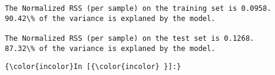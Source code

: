 \documentclass[11pt]{article}
\begin{document}
    \begin{Verbatim}[commandchars=\\\{\}]
The Normalized RSS (per sample) on the training set is 0.0958.
90.42\% of the variance is explaned by the model.

The Normalized RSS (per sample) on the test set is 0.1268.
87.32\% of the variance is explaned by the model.

    \end{Verbatim}

    \begin{Verbatim}[commandchars=\\\{\}]
{\color{incolor}In [{\color{incolor} }]:} 
\end{Verbatim}


    
    
    
    
\end{document}
